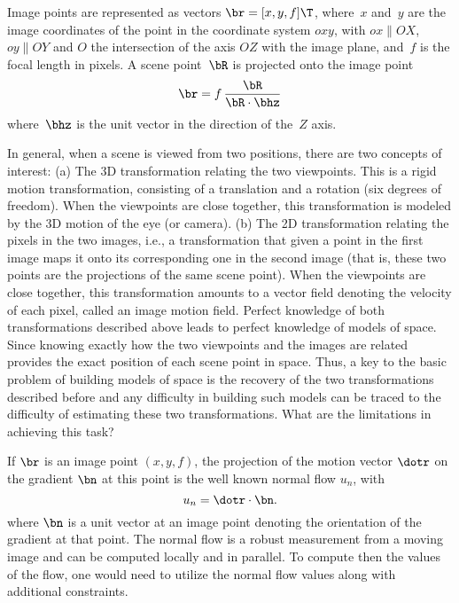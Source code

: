 \documentclass[10pt,twocolumn]{article}
\begin{document}
Image points are represented as vectors $\br = [x, y, f]\T$, where~$x$
and~$y$ are the image coordinates of the point in the coordinate
system $oxy$, with $ox\|OX$, $oy\|OY$ and $O$ the intersection of the
axis $OZ$ with the image plane, and~$f$ is the focal
length in pixels. A scene point~$\bR$ is projected onto the image point
\begin{equation}
\br = f\,\frac{\bR}{\bR\cdot\bhz}
\label{eq:calib-proj}
\end{equation}
where~$\bhz$ is the unit vector in the direction of the~$Z$
axis. 

In
general, when a scene is viewed from two positions, there are two
concepts of interest:
(a) The 3D transformation relating the two viewpoints. This is a
  rigid motion transformation, consisting of a translation and a
  rotation (six degrees of freedom). When the viewpoints are close
  together, this transformation is modeled by the 3D motion of the eye
  (or camera).
(b) The 2D transformation relating the pixels in the two images,
  i.e., a transformation that given a point in the first image maps it
  onto its corresponding one in the second image (that is, these two
  points are the projections of the same scene point). When the
  viewpoints are close together, this transformation amounts to a
  vector field denoting the velocity of each pixel, called an image
  motion field.
Perfect knowledge of both transformations described above leads to
perfect knowledge of models of space. Since knowing exactly how the two
viewpoints and the images are related provides the exact position of
each scene point in space. 
Thus, a key to the basic problem of building models of space is
the recovery of the two transformations described before and any
difficulty in building such models can be traced to the difficulty of
estimating these two transformations. What are the limitations in
achieving this task?

\label{imagemotionfields}
If $\br$ is an image point $(x, y, f)$, the projection of the motion
vector $\dotr$ on the gradient $\bn$ at this point is the well known
normal flow $u_n$, with 
\begin{equation}
  \label{des3}
  u_n = \dotr \cdot \bn.
\end{equation}
where $\bn$ is a unit vector at an image point denoting the
orientation of the gradient at that point. The normal flow is a robust
measurement from a moving image and can be computed locally and in
parallel. To compute then the values of the flow, one would need to
utilize the normal flow values along with additional constraints.
\end{document}
